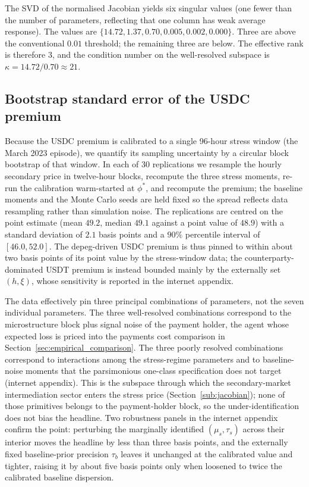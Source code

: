The SVD of the normalised Jacobian yields six singular values (one fewer than the number of parameters, reflecting that one column has weak average response). The values are $\{14.72, 1.37, 0.70, 0.005, 0.002, 0.000\}$. Three are above the conventional $0.01$ threshold; the remaining three are below. The effective rank is therefore $3$, and the condition number on the well-resolved subspace is $\kappa = 14.72/0.70 \approx 21$.

\subsection{Bootstrap standard error of the USDC premium}\label{sub:bootstrap}

Because the USDC premium is calibrated to a single 96-hour stress window (the March 2023 episode), we quantify its sampling uncertainty by a circular block bootstrap of that window. In each of 30 replications we resample the hourly secondary price in twelve-hour blocks, recompute the three stress moments, re-run the calibration warm-started at $\phi^*$, and recompute the premium; the baseline moments and the Monte Carlo seeds are held fixed so the spread reflects data resampling rather than simulation noise. The replications are centred on the point estimate (mean $49.2$, median $49.1$ against a point value of $48.9$) with a standard deviation of $2.1$ basis points and a $90\%$ percentile interval of $[46.0, 52.0]$. The depeg-driven USDC premium is thus pinned to within about two basis points of its point value by the stress-window data; the counterparty-dominated USDT premium is instead bounded mainly by the externally set $(h,\xi)$, whose sensitivity is reported in the internet appendix.

The data effectively pin three principal combinations of parameters, not the seven individual parameters. The three well-resolved combinations correspond to the microstructure block plus signal noise of the payment holder, the agent whose expected loss is priced into the payments cost comparison in Section~\ref{sec:empirical_comparison}. The three poorly resolved combinations correspond to interactions among the stress-regime parameters and to baseline-noise moments that the parsimonious one-class specification does not target (internet appendix). This is the subspace through which the secondary-market intermediation sector enters the stress price (Section~\ref{sub:jacobian}); none of those primitives belongs to the payment-holder block, so the under-identification does not bias the headline. Two robustness panels in the internet appendix confirm the point: perturbing the marginally identified $(\mu_s, \tau_s)$ across their interior moves the headline by less than three basis points, and the externally fixed baseline-prior precision $\tau_b$ leaves it unchanged at the calibrated value and tighter, raising it by about five basis points only when loosened to twice the calibrated baseline dispersion.
